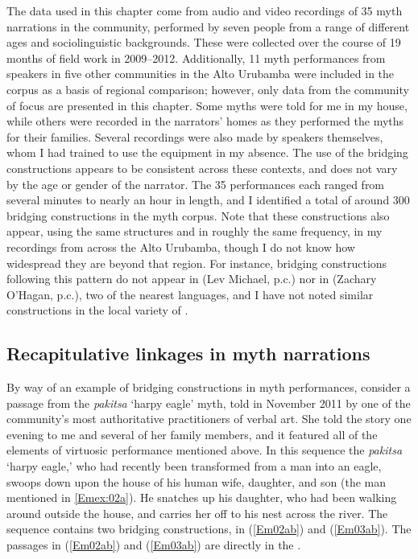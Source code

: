\documentclass[output=paper]{LSP/langsci}
\begin{document}
The data used in this chapter come from audio and video recordings of 35 myth narrations in the community, performed by seven people from a range of different ages and sociolinguistic backgrounds. These were collected over the course of 19 months of field work in 2009--2012. Additionally, 11 myth performances from speakers in five other communities in the {Alto Urubamba} were included in the corpus as a basis of regional comparison; however, only data from the community of focus are presented in this chapter. Some myths were told for me in my house, while others were recorded in the narrators’ homes as they performed the myths for their families. Several recordings were also made by  speakers themselves, whom I had trained to use the equipment in my absence. The use of the bridging constructions appears to be consistent across these contexts, and does not vary by the age or gender of the narrator. The 35 performances each ranged from several minutes to nearly an hour in length, and I identified a total of around 300 bridging constructions in the myth corpus. Note that these constructions also appear, using the same structures and in roughly the same frequency, in my recordings from across the {Alto Urubamba}, though I do not know how widespread they are beyond that region. For instance, bridging constructions following this pattern do not appear in  (Lev Michael, p.c.) nor in  (Zachary O’Hagan, p.c.), two of the nearest  languages, and I have not noted similar constructions in the local variety of . 

\subsection{Recapitulative linkages in myth narrations}
\label{Emrecap.myth}
By way of an example of bridging constructions in  myth performances, consider a passage from the \textit{pakitsa} `harpy eagle' myth, told in November 2011 by one of the community’s most authoritative practitioners of  verbal art. She told the story one evening to me and several of her family members, and it featured all of the elements of virtuosic performance mentioned above. In this sequence the \textit{pakitsa} `harpy eagle,' who had recently been transformed from a man into an eagle, swoops down upon the house of his human wife, daughter, and son (the man mentioned in \ref{Emex:02a}). He snatches up his daughter, who had been walking around outside the house, and carries her off to his nest across the river. The sequence contains two bridging constructions, in (\ref{Em02ab}) and (\ref{Em03ab}). The passages in (\ref{Em02ab}) and (\ref{Em03ab}) are directly  in the . 
\end{document}
